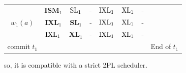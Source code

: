 \begin{table}[H]
\begin{tabular}{c|cccccc|c}
    \multicolumn{1}{|c|}{}             & $\textbf{ISM}_1$         & $\textnormal{SL}_1$     & -          & $\textnormal{IXL}_1$     & $\textnormal{XL}_1$ & -                   &              \\
    \multicolumn{1}{|c|}{$w_1(a)$}     & $\textbf{IXL}_1$         & $\textbf{SL}_1$         & -          & $\textnormal{IXL}_1$     & $\textnormal{XL}_1$ & -                   &              \\
    \multicolumn{1}{|c|}{}             & $\textnormal{IXL}_1$     & $\textbf{XL}_1$         & -          & $\textnormal{IXL}_1$     & $\textnormal{XL}_1$ & -                   &              \\
    \multicolumn{1}{|c|}{commit $t_1$} &                          &                         &            &                          &                     &                     & End of $t_1$ \\ \cline{1-7}
    \end{tabular}
\end{table}
so, it is compatible with a strict 2PL scheduler. 